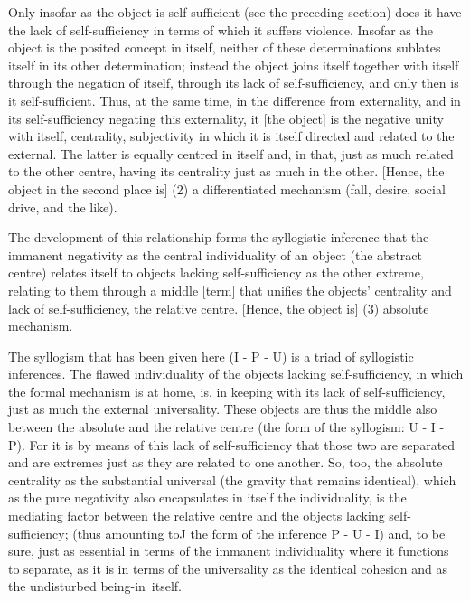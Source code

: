Only insofar as the object is self-sufficient
(see the preceding section)
does it have the lack of self-sufficiency
in terms of which it suffers violence.
Insofar as the object is the posited concept in itself,
neither of these determinations sublates itself
in its other determination;
instead the object joins itself together with itself
through the negation of itself,
through its lack of self-sufficiency,
and only then is it self-sufficient.
Thus, at the same time, in the difference from externality,
and in its self-sufficiency negating this externality,
it [the object] is the negative unity with itself, centrality,
subjectivity in which it is itself directed and related to the external.
The latter is equally centred in itself and, in that, just as much related
to the other centre, having its centrality just as much in the other.
[Hence, the object in the second place is]
(2) a differentiated mechanism (fall, desire, social drive, and the like).

The development of this relationship forms the syllogistic inference
that the immanent negativity as the central individuality of an object
(the abstract centre) relates itself to objects lacking self-sufficiency as
the other extreme, relating to them through a middle [term] that
unifies the objects' centrality and lack of self-sufficiency,
the relative centre. [Hence, the object is]
(3) absolute mechanism.

The syllogism that has been given here (I - P - U)
is a triad of syllogistic inferences.
The flawed individuality of the objects lacking self-sufficiency,
in which the formal mechanism is at home, is,
in keeping with its lack of self-sufficiency,
just as much the external universality.
These objects are thus the middle also
between the absolute and the relative centre
(the form of the syllogism: U - I - P).
For it is by means of this lack of self-sufficiency
that those two are separated and are extremes
just as they are related to one another.
So, too, the absolute centrality as the substantial universal
(the gravity that remains identical),
which as the pure negativity also encapsulates in itself the individuality,
is the mediating factor between the relative centre
and the objects lacking self-sufficiency;
(thus amounting toJ the form of the inference P - U - I)
and, to be sure, just as essential
in terms of the immanent individuality
where it functions to separate,
as it is in terms of the universality
as the identical cohesion and
as the undisturbed being-in~itself.

